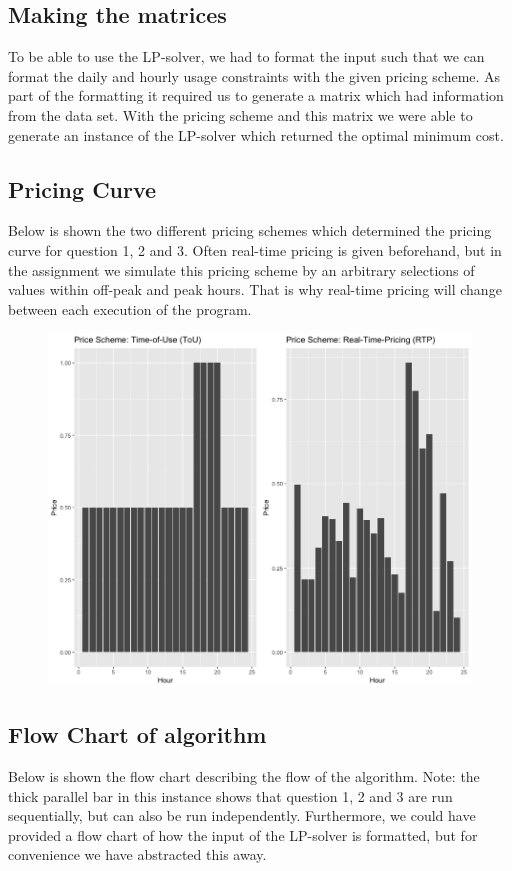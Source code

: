 \documentclass[
11pt, %
english, %
singlespacing, %
parskip, %
headsepline, %
]{report} %
\begin{document}
	\subsection{Making the matrices}
	To be able to use the LP-solver, we had to format the input such that we can format the daily and hourly usage constraints with the given pricing scheme. As part of the formatting it required us to generate a matrix which had information from the data set. With the pricing scheme and this matrix we were able to generate an instance of the LP-solver which returned the optimal minimum cost.

	\subsection{Pricing Curve}
    Below is shown the two different pricing schemes which determined the pricing curve for question 1, 2 and 3.
    Often real-time pricing is given beforehand, but in the assignment we simulate this pricing scheme by an arbitrary selections of values within off-peak and peak hours. That is why real-time pricing will change between each execution of the program.

    \begin{figure}[ht]
    \includegraphics[scale=0.3]{pricing_schemes.png}
    \centering
    \end{figure}

\newpage

    \subsection{Flow Chart of algorithm}
    Below is shown the flow chart describing the flow of the algorithm. Note: the thick parallel bar in this instance shows that question 1, 2 and 3 are run sequentially, but can also be run independently. Furthermore, we could have provided a flow chart of how the input of the LP-solver is formatted, but for convenience we have abstracted this away.
\end{document}
